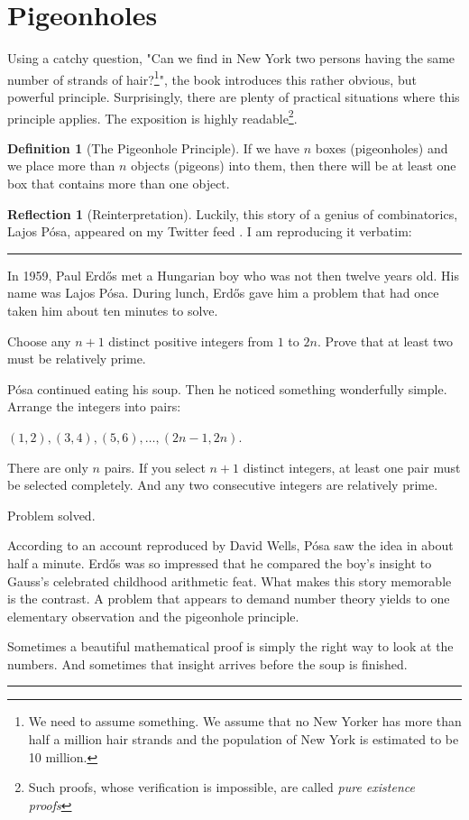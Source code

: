 \documentclass[11pt]{book}
\theoremstyle{definition}
\newtheorem{definition}{Definition}
\theoremstyle{plain}
\theoremstyle{definition}
\theoremstyle{problemstyle}
\theoremstyle{remark}
\theoremstyle{definition}
\newtheorem{reflection}{Reflection}
\begin{document}
\section{Pigeonholes}
Using a catchy question, "Can we find in New York two persons having the same number of strands of hair?\footnote{We need to assume something. We assume that no New Yorker has more than half a million hair strands and the population of New York is estimated to be 10 million.}", the book introduces this rather obvious, but powerful principle. Surprisingly, there are plenty of practical situations where this principle applies. The exposition is highly readable\footnote{Such proofs, whose verification is impossible, are called \emph{pure existence proofs}}.
\begin{definition}[The Pigeonhole Principle]
    \label{def:php}
    If we have $n$ boxes (pigeonholes) and we place more than $n$ objects (pigeons) into them, then there will be at least one box that contains more than one object.
\end{definition}
\begin{reflection}[Reinterpretation]
    Luckily, this story of a genius of combinatorics, Lajos Pósa, appeared on my Twitter feed \cite{posa-story}. I am reproducing it verbatim:
\vspace{5mm}

\hrule

In 1959, Paul Erdős met a Hungarian boy who was not then twelve years old. His name was Lajos Pósa.  During lunch, Erdős gave him a problem that had once taken him about ten minutes to solve.

Choose any $n+1$ distinct positive integers from $1$ to $2n$. Prove that at least two must be relatively prime.

Pósa continued eating his soup. Then he noticed something wonderfully simple. Arrange the integers into pairs:

$(1,2),(3,4),(5,6),\dots,(2n−1,2n)$.

There are only $n$ pairs. If you select $n+1$ distinct integers, at least one pair must be selected completely. And any two consecutive integers are relatively prime.

Problem solved.

According to an account reproduced by David Wells, Pósa saw the idea in about half a minute. Erdős was so impressed that he compared the boy's insight to Gauss's celebrated childhood arithmetic feat. What makes this story memorable is the contrast. A problem that appears to demand number theory yields to one elementary observation and the pigeonhole principle.

Sometimes a beautiful mathematical proof is simply the right way to look at the numbers. And sometimes that insight arrives before the soup is finished.

\vspace{5mm}

\hrule

\end{reflection}
\end{document}
